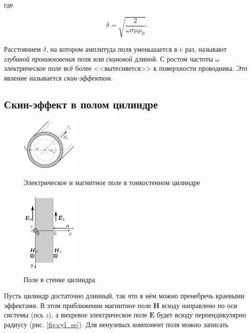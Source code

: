 \documentclass[a4paper, 12pt]{article}
\begin{document}
    где

    \begin{equation}
        \delta = \sqrt{\frac{2}{\omega\sigma\mu\mu_0}}.
        \label{eq:delta}
    \end{equation}

    Расстоянием $\delta$, на котором амплитуда поля уменьшается в $e$ раз, называют \textit{глубиной проникновения} поля или \textit{скиновой} длиной. С ростом частоты $\omega$ электрическое поле всё более <<вытесняется>> к поверхности проводника. Это явление называется \textit{скин-эффектом}.

    \subsection{Скин-эффект в полом цилиндре}

    \begin{figure}
        \centering
        \includegraphics[width=0.25\textwidth]{images/cyl_se.png}
        \caption{Электрическое и магнитное поле в тонкостенном цилиндре}
        \label{fig:cyl_se}

        \includegraphics[width=0.25\textwidth]{images/cyl_flat_se.png}
        \caption{Поле в стенке цилиндра}
        \label{fig:cyl_flat_se}
        
    \end{figure}

    Пусть цилиндр достаточно длинный, так что в нём можно пренебречь краевыми эффектами. В этом приближении магнитное поле $\bm{H}$ всюду направлено по оси системы (ось $z$), а вихревое электрическое поле $\bm{E}$ будет всюду перпендикулярно радиусу (рис. \ref{fig:cyl_se}). Для ненулевых компонент поля можно записать
\end{document}
